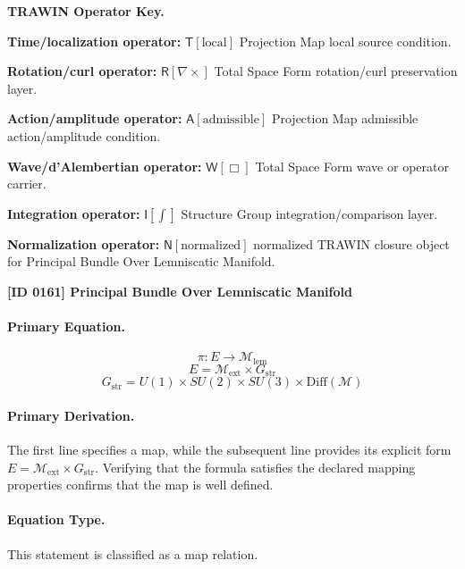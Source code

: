 \par\vspace{0.45\baselineskip}
\noindent\begin{minipage}[t]{\linewidth}
\begingroup
\small
\raggedright
\textbf{TRAWIN Operator Key.}\par
\noindent\textbf{Time/localization operator:} $\mathsf{T}\!\left[\mathrm{local}\right]$ Projection Map local source condition.\par
\noindent\textbf{Rotation/curl operator:} $\mathsf{R}\!\left[\nabla\times\right]$ Total Space Form rotation/curl preservation layer.\par
\noindent\textbf{Action/amplitude operator:} $\mathsf{A}\!\left[\mathrm{admissible}\right]$ Projection Map admissible action/amplitude condition.\par
\noindent\textbf{Wave/d'Alembertian operator:} $\mathsf{W}\!\left[\Box\right]$ Total Space Form wave or operator carrier.\par
\noindent\textbf{Integration operator:} $\mathsf{I}\!\left[\int\right]$ Structure Group integration/comparison layer.\par
\noindent\textbf{Normalization operator:} $\mathsf{N}\!\left[\mathrm{normalized}\right]$ normalized TRAWIN closure object for Principal Bundle Over Lemniscatic Manifold.\par
\endgroup
\end{minipage}

\clearpage
\noindent\textbf{[ID 0161] Principal Bundle Over Lemniscatic Manifold}\par
\vspace{0.35em}
\paragraph{Primary Equation.}
\[
\pi:E\to \mathcal{M}_{\mathrm{lem}}
\]
\[
E=\mathcal{M}_{\mathrm{ext}}\times G_{\mathrm{str}}
\]
\[
G_{\mathrm{str}}=U(1)\times SU(2)\times SU(3)\times \mathrm{Diff}(\mathcal{M})
\]

\paragraph{Primary Derivation.}
The first line specifies a map, while the subsequent line provides its explicit form \( E=\mathcal{M}_{\mathrm{ext}}\times G_{\mathrm{str}} \). Verifying that the formula satisfies the declared mapping properties confirms that the map is well defined.
\paragraph{Equation Type.}
This statement is classified as a map relation.

